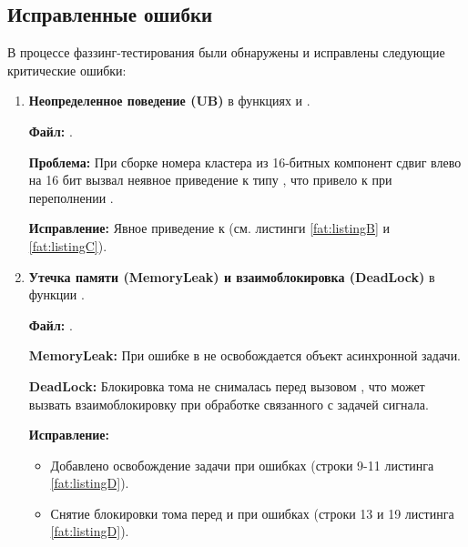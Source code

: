 \subsection{Исправленные ошибки}

В процессе фаззинг-тестирования были обнаружены и исправлены следующие критические ошибки:
\begin{enumerate}
	\item \textbf{Неопределенное поведение (UB)} в функциях  и .
	
	\textbf{Файл:} .
	
	\textbf{Проблема:} При сборке номера кластера  из 16-битных компонент сдвиг влево на 16 бит вызвал неявное приведение к типу , что привело к  при переполнении \cite{ISO_C17}.
	
	\textbf{Исправление:} Явное приведение к  (см. листинги \ref{fat:listingB} и \ref{fat:listingC}).
	 
	 
	
	\item \textbf{Утечка памяти (MemoryLeak) и взаимоблокировка (DeadLock)} в функции .
	
	\textbf{Файл:} .
	
	\textbf{MemoryLeak:} При ошибке в  не освобождается объект асинхронной задачи.
	
	\textbf{DeadLock:} Блокировка тома не снималась перед вызовом , что может вызвать взаимоблокировку при обработке связанного с задачей сигнала.
	
	\textbf{Исправление:}
	\begin{itemize}
		\item Добавлено освобождение задачи при ошибках (строки 9-11 листинга \ref{fat:listingD}).
		\item Снятие блокировки тома перед  и при ошибках (строки 13 и 19 листинга  \ref{fat:listingD}).
	\end{itemize}
	 
	

\end{enumerate}
